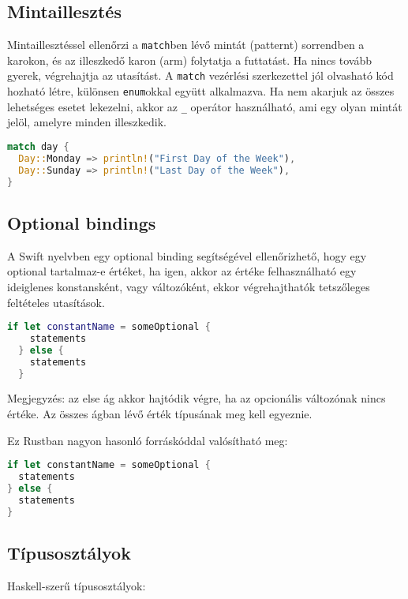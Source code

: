 \subsection{Mintaillesztés}
Mintaillesztéssel ellenőrzi a \lstinline{match}ben lévő mintát (patternt) sorrendben a karokon, és az illeszkedő karon (arm) folytatja a futtatást. Ha nincs tovább gyerek, végrehajtja az utasítást. A \lstinline{match} vezérlési szerkezettel jól olvasható kód hozható létre, különsen \lstinline{enum}okkal együtt alkalmazva. Ha nem akarjuk az összes lehetséges esetet lekezelni, akkor az \lstinline{_} operátor használható, ami egy olyan mintát jelöl, amelyre minden illeszkedik.
\begin{lstlisting}[language=Rust, style=boxed]
match day {
  Day::Monday => println!("First Day of the Week"),
  Day::Sunday => println!("Last Day of the Week"),
}
\end{lstlisting}

\subsection{Optional bindings}
A Swift nyelvben egy optional binding segítségével ellenőrizhető, hogy egy optional tartalmaz-e értéket, ha igen, akkor az értéke felhasználható egy ideiglenes konstansként, vagy változóként, ekkor végrehajthatók tetszőleges feltételes utasítások. %
\begin{lstlisting}[language=Swift]
  if let constantName = someOptional {
    statements
  } else {
    statements
  }
\end{lstlisting}
Megjegyzés: az else ág akkor hajtódik végre, ha az opcionális változónak nincs értéke. Az összes ágban lévő érték típusának meg kell egyeznie.

Ez Rustban nagyon hasonló forráskóddal valósítható meg:
\begin{lstlisting}[language=Rust, style=boxed, style=colouredRust]
if let constantName = someOptional {
  statements
} else {
  statements
}
\end{lstlisting}

\subsection{Típusosztályok}
Haskell-szerű típusosztályok:

